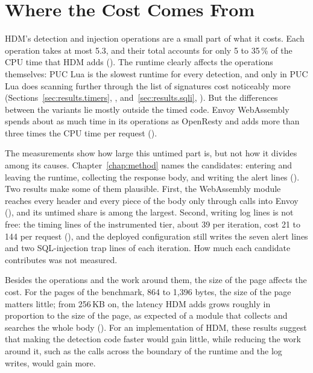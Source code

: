 \documentclass{rptuma}
\begin{document}
\FloatBarrier

\section{Where the Cost Comes From}
\label{sec:disc.cost}

HDM's detection and injection operations are a small part of what it costs. Each operation takes at
most 5.3\us, and their total accounts for only 5 to 35\,\% of the CPU time that HDM adds
(). The runtime clearly affects the operations themselves: PUC Lua is
the slowest runtime for every detection, and only in PUC Lua does scanning further through the list
of signatures cost noticeably more (Sections~\ref{sec:results.timers},
\emph{}, and~\ref{sec:results.sqli},
\emph{}). But the differences between the variants lie mostly outside
the timed code. Envoy WebAssembly spends about as much time in its operations as OpenResty and adds
more than three times the CPU time per request ().

The measurements show how large this untimed part is, but not how it divides among its causes.
Chapter~\ref{chap:method} names the candidates: entering and leaving the runtime, collecting the
response body, and writing the alert lines (). Two results make
some of them plausible. First, the WebAssembly module reaches every header and every piece of the
body only through calls into Envoy (), and its untimed share is among
the largest. Second, writing log lines is not free: the timing lines of the instrumented tier, about
39 per iteration, cost 21 to 144\us{} per request (), and the
deployed configuration still writes the seven alert lines and two SQL-injection trap lines of each
iteration. How much each candidate contributes was not measured.

Besides the operations and the work around them, the size of the page affects the cost. For the pages of the benchmark, 864 to 1,396 bytes, the
size of the page matters little; from 256\,KB on, the latency HDM adds grows roughly in proportion to the size
of the page, as expected of a module that collects and searches the whole body
(). For an implementation of HDM, these results suggest that making
the detection code faster would gain little, while reducing the work around it, such as the calls
across the boundary of the runtime and the log writes, would gain more.
\end{document}
